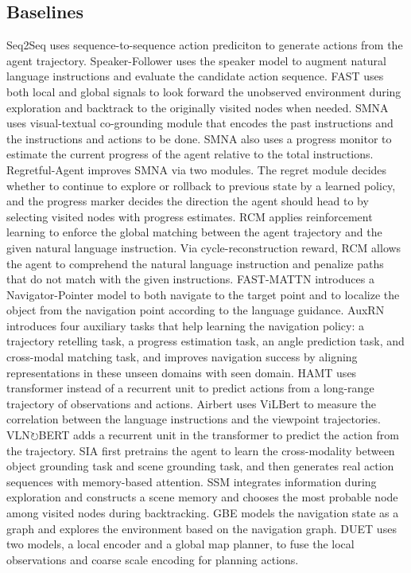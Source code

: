 \documentclass[10pt,twocolumn,letterpaper]{article}
\begin{document}
\subsection{Baselines}
\noindent Seq2Seq \cite{anderson2018vision} uses sequence-to-sequence action prediciton to generate actions from the agent trajectory.
Speaker-Follower \cite{fried2018speaker} uses the speaker model to augment natural language instructions and evaluate the candidate action sequence. 
FAST \cite{ke2019tactical} uses both local and global signals to look forward the unobserved environment during exploration and backtrack to the originally visited nodes when needed.
SMNA \cite{ma2019self} uses visual-textual co-grounding module that encodes the past instructions and the instructions and actions to be done. SMNA also uses a progress monitor to estimate the current progress of the agent relative to the total instructions.
Regretful-Agent \cite{ma2019regretful} improves SMNA via two modules. The regret module decides whether to continue to explore or rollback to previous state by a learned policy, and the progress marker decides the direction the agent should head to by selecting visited nodes with progress estimates.
RCM \cite{wang2019reinforced} applies reinforcement learning to enforce the global matching between the agent trajectory and the given natural language instruction. Via cycle-reconstruction reward, RCM allows the agent to comprehend the natural language instruction and penalize paths that do not match with the given instructions.
FAST-MATTN \cite{qi2020reverie} introduces a Navigator-Pointer model to both navigate to the target point and to localize the object from the navigation point according to the language guidance.
AuxRN \cite{zhu2020vision} introduces four auxiliary tasks that help learning the navigation policy: a trajectory retelling task, a progress estimation task, an angle prediction task, and cross-modal matching task, and improves navigation success by aligning representations in these unseen domains with seen domain.
HAMT \cite{chen2021history} uses transformer instead of a recurrent unit to predict actions from a long-range trajectory of observations and actions.
Airbert \cite{guhur2021airbert} uses ViLBert \cite{lu2019vilbert} to measure the correlation between the language instructions and
the viewpoint trajectories.
VLN$\circlearrowright$BERT \cite{hong2021vln} adds a recurrent unit in the transformer to predict the action from the trajectory.
SIA \cite{Lin_2021_CVPRsia} first pretrains the agent to learn the cross-modality between object grounding task and scene grounding task, and then generates real action sequences with memory-based attention.
SSM \cite{Wang_2021_CVPR-structured-scene} integrates information during exploration and constructs a scene memory and chooses the most probable node among visited nodes during backtracking. 
GBE \cite{zhu2021soon} models the navigation state as a graph and explores the environment based on the navigation graph.
DUET \cite{chen2022think} uses two models, a local encoder and a global map planner, to fuse the local observations and coarse scale encoding
for planning actions.\\
\end{document}

